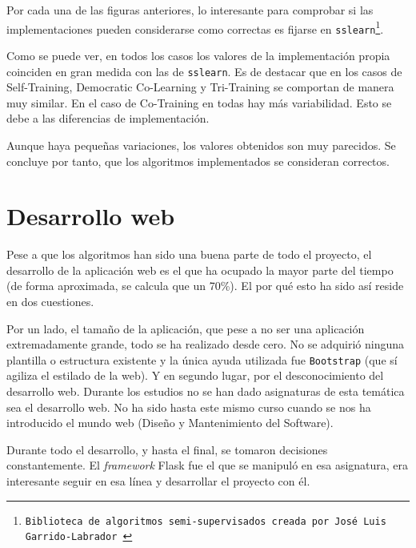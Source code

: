



Por cada una de las figuras anteriores, lo interesante para comprobar si las
implementaciones pueden considerarse como correctas es fijarse en
\texttt{sslearn\footnote{Biblioteca de algoritmos semi-supervisados creada por
José Luis Garrido-Labrador~\cite{jose_luis_garrido_labrador_2023_7781117}}}.

Como se puede ver, en todos los casos los valores de la implementación propia
coinciden en gran medida con las de \texttt{sslearn}. Es de destacar que en los
casos de Self-Training, Democratic Co-Learning y Tri-Training se comportan de
manera muy similar. En el caso de Co-Training en todas hay más variabilidad.
Esto se debe a las diferencias de implementación.

Aunque haya pequeñas variaciones, los valores obtenidos son muy parecidos. Se
concluye por tanto, que los algoritmos implementados se consideran correctos.


\section{Desarrollo web}

Pese a que los algoritmos han sido una buena parte de todo el proyecto, el
desarrollo de la aplicación web es el que ha ocupado la mayor parte del tiempo
(de forma aproximada, se calcula que un 70\%). El por qué esto ha sido así
reside en dos cuestiones. 

Por un lado, el tamaño de la aplicación, que pese a no ser una aplicación
extremadamente grande, todo se ha realizado desde cero. No se adquirió ninguna
plantilla o estructura existente y la única ayuda utilizada fue
\texttt{Bootstrap} (que sí agiliza el estilado de la web). Y en segundo lugar,
por el desconocimiento del desarrollo web. Durante los estudios no se han dado
asignaturas de esta temática sea el desarrollo web. No ha sido hasta este mismo
curso cuando se nos ha introducido el mundo web (Diseño y Mantenimiento del
Software).

Durante todo el desarrollo, y hasta el final, se tomaron decisiones
constantemente. El \emph{framework} Flask fue el que se manipuló en esa
asignatura, era interesante seguir en esa línea y desarrollar el proyecto con
él. 

